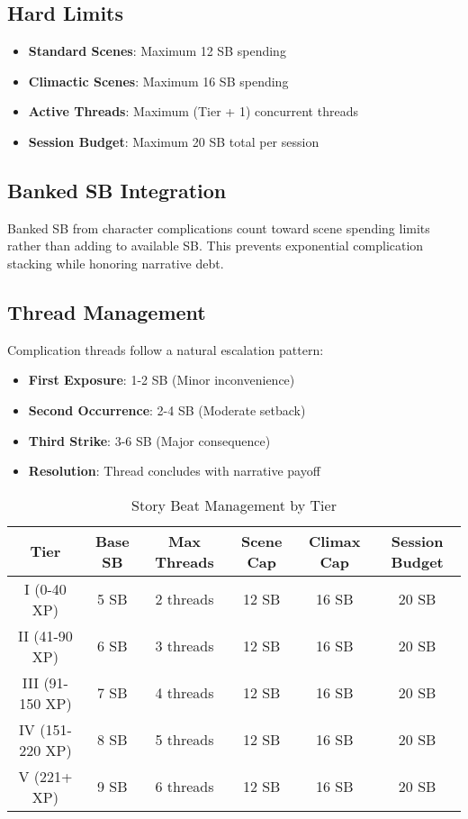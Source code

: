 \subsection{Hard Limits}
\begin{itemize}
    \item \textbf{Standard Scenes}: Maximum 12 SB spending
    \item \textbf{Climactic Scenes}: Maximum 16 SB spending
    \item \textbf{Active Threads}: Maximum (Tier + 1) concurrent threads
    \item \textbf{Session Budget}: Maximum 20 SB total per session
\end{itemize}

\subsection{Banked SB Integration}
Banked SB from character complications count toward scene spending limits rather than adding to available SB. This prevents exponential complication stacking while honoring narrative debt.

\subsection{Thread Management}
Complication threads follow a natural escalation pattern:
\begin{itemize}
    \item \textbf{First Exposure}: 1-2 SB (Minor inconvenience)
    \item \textbf{Second Occurrence}: 2-4 SB (Moderate setback)
    \item \textbf{Third Strike}: 3-6 SB (Major consequence)
    \item \textbf{Resolution}: Thread concludes with narrative payoff
\end{itemize}

\begin{table}[htbp]
\centering
\caption{Story Beat Management by Tier}
\begin{tabular}{|c|c|c|c|c|c|}
\hline
\textbf{Tier} & \textbf{Base SB} & \textbf{Max Threads} & \textbf{Scene Cap} & \textbf{Climax Cap} & \textbf{Session Budget} \\
\hline
I (0-40 XP) & 5 SB & 2 threads & 12 SB & 16 SB & 20 SB \\
II (41-90 XP) & 6 SB & 3 threads & 12 SB & 16 SB & 20 SB \\
III (91-150 XP) & 7 SB & 4 threads & 12 SB & 16 SB & 20 SB \\
IV (151-220 XP) & 8 SB & 5 threads & 12 SB & 16 SB & 20 SB \\
V (221+ XP) & 9 SB & 6 threads & 12 SB & 16 SB & 20 SB \\
\hline
\end{tabular}
\end{table}

